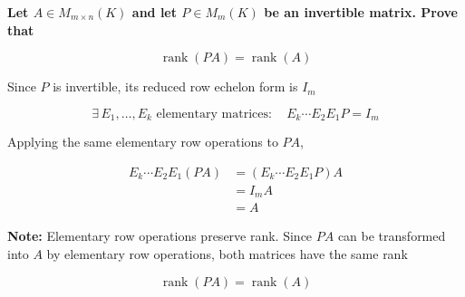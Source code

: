 \item \textbf{Let $A\in M_{m\times n}(K)$
and let $P\in M_m(K)$ be an invertible matrix.
Prove that}

$$
\operatorname{rank}(PA)=\operatorname{rank}(A)
$$


\begin{answer}
    Since $P$ is invertible, its reduced row echelon form is $I_m$

    $$
    \exists\,E_1,\ldots,E_k \text{ elementary matrices}: \quad E_k\cdots E_2E_1P=I_m
    $$

    Applying the same elementary row operations to $PA$,

    $$
    \begin{aligned}
    E_k\cdots E_2E_1(PA)
    &=(E_k\cdots E_2E_1P)A \\
    &=I_mA \\
    &=A
    \end{aligned}
    $$

    {\color{red} \textbf{Note:} Elementary row operations preserve rank. Since $PA$ can be
    transformed into $A$ by elementary row operations, both matrices have the same rank}

    $$
    \boxed{\operatorname{rank}(PA)=\operatorname{rank}(A)}
    $$
\end{answer}
